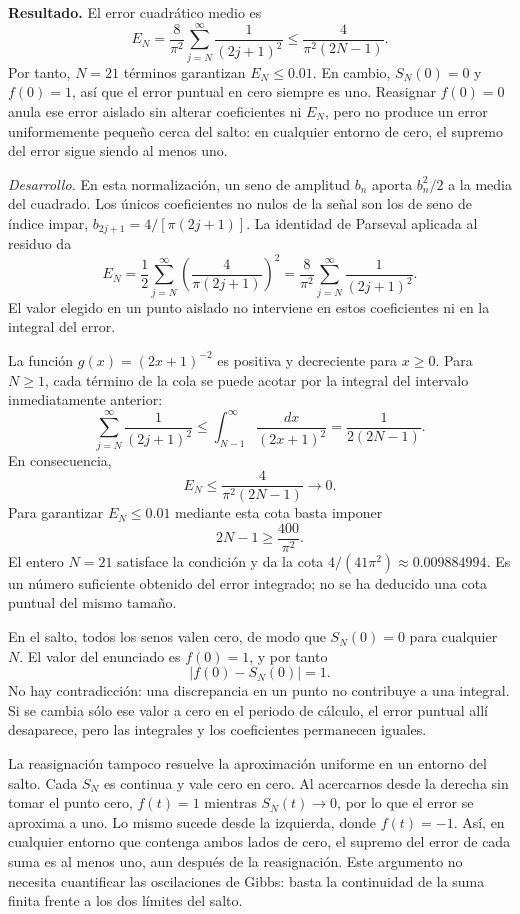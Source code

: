 \noindent\textbf{Resultado.} El error cuadrático medio es
\[
E_N=\frac8{\pi^2}\sum_{j=N}^{\infty}\frac1{(2j+1)^2}
\le\frac4{\pi^2(2N-1)}.
\]
Por tanto, \(N=21\) términos garantizan \(E_N\le0.01\). En cambio, \(S_N(0)=0\) y \(f(0)=1\), así que el error puntual en cero siempre es uno. Reasignar \(f(0)=0\) anula ese error aislado sin alterar coeficientes ni \(E_N\), pero no produce un error uniformemente pequeño cerca del salto: en cualquier entorno de cero, el supremo del error sigue siendo al menos uno.

\noindent\textit{Desarrollo.} En esta normalización, un seno de amplitud \(b_n\) aporta \(b_n^2/2\) a la media del cuadrado. Los únicos coeficientes no nulos de la señal son los de seno de índice impar, \(b_{2j+1}=4/[\pi(2j+1)]\). La identidad de Parseval aplicada al residuo da
\[
E_N=\frac12\sum_{j=N}^{\infty}
\left(\frac4{\pi(2j+1)}\right)^2
=\frac8{\pi^2}\sum_{j=N}^{\infty}\frac1{(2j+1)^2}.
\]
El valor elegido en un punto aislado no interviene en estos coeficientes ni en la integral del error.

La función \(g(x)=(2x+1)^{-2}\) es positiva y decreciente para \(x\ge0\). Para \(N\ge1\), cada término de la cola se puede acotar por la integral del intervalo inmediatamente anterior:
\[
\sum_{j=N}^{\infty}\frac1{(2j+1)^2}
\le\int_{N-1}^{\infty}\frac{dx}{(2x+1)^2}
=\frac1{2(2N-1)}.
\]
En consecuencia,
\[
E_N\le\frac4{\pi^2(2N-1)}\longrightarrow0.
\]
Para garantizar \(E_N\le0.01\) mediante esta cota basta imponer
\[
2N-1\ge\frac{400}{\pi^2}.
\]
El entero \(N=21\) satisface la condición y da la cota \(4/(41\pi^2)\approx0.009884994\). Es un número suficiente obtenido del error integrado; no se ha deducido una cota puntual del mismo tamaño.

En el salto, todos los senos valen cero, de modo que \(S_N(0)=0\) para cualquier \(N\). El valor del enunciado es \(f(0)=1\), y por tanto
\[
|f(0)-S_N(0)|=1.
\]
No hay contradicción: una discrepancia en un punto no contribuye a una integral. Si se cambia sólo ese valor a cero en el periodo de cálculo, el error puntual allí desaparece, pero las integrales y los coeficientes permanecen iguales.

La reasignación tampoco resuelve la aproximación uniforme en un entorno del salto. Cada \(S_N\) es continua y vale cero en cero. Al acercarnos desde la derecha sin tomar el punto cero, \(f(t)=1\) mientras \(S_N(t)\to0\), por lo que el error se aproxima a uno. Lo mismo sucede desde la izquierda, donde \(f(t)=-1\). Así, en cualquier entorno que contenga ambos lados de cero, el supremo del error de cada suma es al menos uno, aun después de la reasignación. Este argumento no necesita cuantificar las oscilaciones de Gibbs: basta la continuidad de la suma finita frente a los dos límites del salto.
